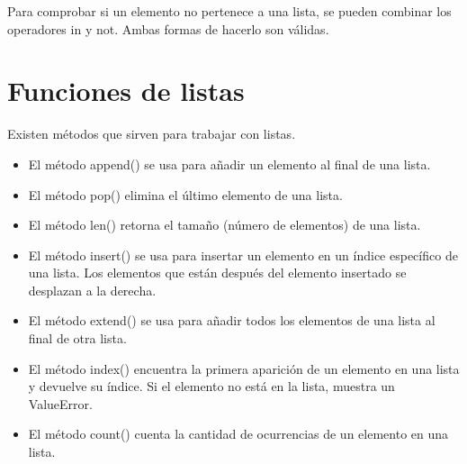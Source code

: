 \documentclass{report}
\begin{document}
{Para comprobar si un elemento no pertenece a una lista, se pueden combinar los operadores in y not. Ambas formas de hacerlo son válidas.


\section{Funciones de listas}

Existen métodos que sirven para trabajar con listas.

\begin{itemize}
  \item El método append() se usa para añadir un elemento al final de una lista.
  

  \item El método pop() elimina el último elemento de una lista.
  

  \item El método len() retorna el tamaño (número de elementos) de una lista.
  

  \item El método insert() se usa para insertar un elemento en un índice específico de una lista. Los elementos que están después del elemento insertado se desplazan a la derecha.


  \item El método extend() se usa para añadir todos los elementos de una lista al final de otra lista.
  

  \item El método index() encuentra la primera aparición de un elemento en una lista y devuelve su índice. Si el elemento no está en la lista, muestra un ValueError.
  

  \item El método count() cuenta la cantidad de ocurrencias de un elemento en una lista.
  


\end{itemize}}
\end{document}
